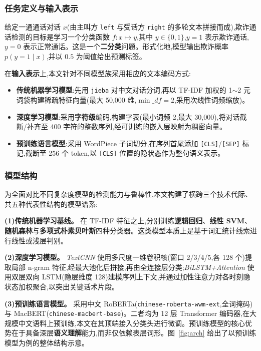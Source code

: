 \documentclass[11pt,a4paper]{article}
\begin{document}
\subsubsection{任务定义与输入表示}

给定一通通话对话 $x$(由主叫方 \texttt{left} 与受话方 \texttt{right} 的多轮文本拼接而成),欺诈通话检测的目标是学习一个分类函数 $f: x \mapsto y$,其中 $y \in \{0, 1\}$,$y=1$ 表示欺诈通话,$y=0$ 表示正常通话。这是一个\textbf{二分类}问题。形式化地,模型输出欺诈概率 $p(y{=}1 \mid x)$,并以 $0.5$ 为阈值给出预测标签。

在\textbf{输入表示}上,本文针对不同模型族采用相应的文本编码方式:

\begin{itemize}[leftmargin=2em,itemsep=0.2em]
\item \textbf{传统机器学习模型}:先用 \texttt{jieba} 对中文对话分词,再以 TF-IDF 加权的 1$\sim$2 元词袋构建稀疏特征向量(最大 50{,}000 维,$\min\_df{=}2$,采用次线性词频缩放)。
\item \textbf{深度学习模型}:采用\textbf{字符级}编码,构建字表(最小词频 2,最大 30{,}000),将对话截断/补齐至 400 字符的整数序列,经可训练的嵌入层映射为稠密向量。
\item \textbf{预训练语言模型}:采用 WordPiece 子词切分,在序列首尾添加 \texttt{[CLS]}/\texttt{[SEP]} 标记,截断至 256 个 token,以 \texttt{[CLS]} 位置的隐状态作为整句语义表示。
\end{itemize}

\subsubsection{模型结构}

为全面对比不同复杂度模型的检测能力与鲁棒性,本文构建了横跨三个技术代际、共五种代表性结构的模型谱系:

\textbf{(1)传统机器学习基线。} 在 TF-IDF 特征之上,分别训练\textbf{逻辑回归}、\textbf{线性 SVM}、\textbf{随机森林}与\textbf{多项式朴素贝叶斯}四种分类器。这类模型本质上是基于词汇统计线索进行线性或浅层判别。

\textbf{(2)深度学习模型。} \emph{TextCNN} 使用多尺度一维卷积核(窗口 2/3/4/5,各 128 个)提取局部 n-gram 特征,经最大池化后拼接,再由全连接层分类;\emph{BiLSTM+Attention} 使用双层双向 LSTM(隐层维度 128)建模序列上下文,并通过加性注意力对各时刻隐状态加权聚合,以突出关键话术片段。

\textbf{(3)预训练语言模型。} 采用中文 RoBERTa(\texttt{chinese-roberta-wwm-ext},全词掩码)与 MacBERT(\texttt{chinese-}\allowbreak\texttt{macbert-base})。二者均为 12 层 Transformer 编码器,在大规模中文语料上预训练,本文在其顶端接入分类头进行微调。预训练模型的核心优势在于具备深层\textbf{语义理解}能力,而非仅依赖表层词形。图~\ref{fig:arch} 给出了以预训练模型为例的整体结构示意。
\end{document}
